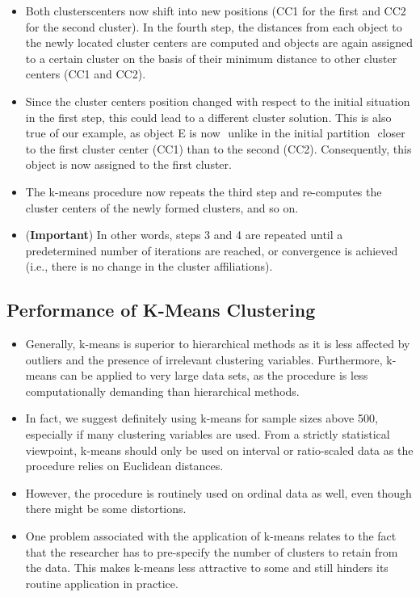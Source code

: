 \documentclass[a4paper,12pt]{article}
\begin{document}
\begin{itemize}
\begin{figure}[h!]
\begin{center}
	\end{center}
\end{figure}
\item Both clusterscenters now shift into new positions (CC1 for the first and CC2 for the second cluster).
In the fourth step, the distances from each object to the newly located cluster
centers are computed and objects are again assigned to a certain cluster on the basis
of their minimum distance to other cluster centers (CC1 and CC2).

\item Since the cluster centers position changed with respect to the initial situation in the first step,
this could lead to a different cluster solution. This is also true of our example, as
object E is now  unlike in the initial partition  closer to the first cluster center
(CC1) than to the second (CC2). Consequently, this object is now assigned to the
first cluster.
\item The k-means procedure now repeats the third step and
re-computes the cluster centers of the newly formed clusters, and so on.
\item (\textbf{Important}) In other words, steps 3 and 4 are repeated until a predetermined number of iterations are
reached, or convergence is achieved (i.e., there is no change in the cluster affiliations).
\end{itemize}
\subsection{Performance of K-Means Clustering}
\begin{itemize}
\item Generally, k-means is superior to hierarchical methods as it is less affected by
outliers and the presence of irrelevant clustering variables. Furthermore, k-means
can be applied to very large data sets, as the procedure is less computationally
demanding than hierarchical methods. 
\item In fact, we suggest definitely using k-means
for sample sizes above 500, especially if many clustering variables are used. From
a strictly statistical viewpoint, k-means should only be used on interval or ratio-scaled
data as the procedure relies on Euclidean distances. 
\item However, the procedure is
routinely used on ordinal data as well, even though there might be some distortions.

\item One problem associated with the application of k-means relates to the fact that
the researcher has to pre-specify the number of clusters to retain from the data. This
makes k-means less attractive to some and still hinders its routine application in
practice.
\end{itemize}
\end{document}
